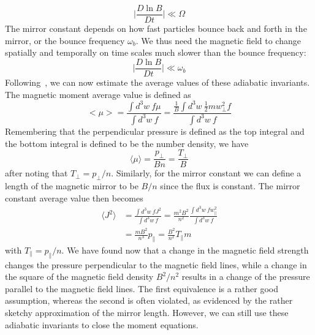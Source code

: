 \begin{equation*}
  \big|\frac{D\ln B}{Dt}\big|\ll\Omega
\end{equation*}
The mirror constant depends on how fast particles bounce back and forth in the mirror, or the bounce frequency $\omega_b$. We thus need the magnetic field to change spatially and temporally on time scales much slower than the bounce frequency:
\begin{equation*}
  \big|\frac{D\ln B}{Dt}\big|\ll\omega_b
\end{equation*}
Following~\citet{KunzBraginskii}, we can now estimate the average values of these adiabatic invariants. The magnetic moment average value is defined as
\begin{equation*}
  <\mu>=\frac{\int d^3w~f\mu}{\int d^3w~f}=\frac{\frac1B\int d^3w~\frac12mw_\perp^2f}{\int d^3w~f}
\end{equation*}
Remembering that the perpendicular pressure is defined as the top integral and the bottom integral is defined to be the number density, we have
\begin{equation}
  \langle\mu\rangle=\frac{p_\perp}{Bn}=\frac{T_\perp}{B} \label{eq:muavg}
\end{equation}
after noting that $T_\perp=p_\perp/n$. Similarly, for the mirror constant we can define a length of the magnetic mirror to be $B/n$ since the flux is constant. The mirror constant average value then becomes
\begin{align}
  \langle J^2\rangle&=\frac{\int d^3w~fJ^2}{\int d^3w~f}=\frac{m^2B^2}{n^2}\frac{\int d^3w~fw_\parallel^2}{\int d^3w~f} \nonumber\\
  &=\frac{mB^2}{n^3}p_\parallel=\frac{B^2}{n^2}T_\parallel m\label{eq:javg}
\end{align}
with $T_\parallel=p_\parallel/n$. We have found now that a change in the magnetic field strength changes the pressure perpendicular to the magnetic field lines, while a change in the square of the magnetic field density $B^2/n^2$ results in a change of the pressure parallel to the magnetic field lines. The first equivalence is a rather good assumption, whereas the second is often violated, as evidenced by the rather sketchy approximation of the mirror length. However, we can still use these adiabatic invariants to close the moment equations. 

